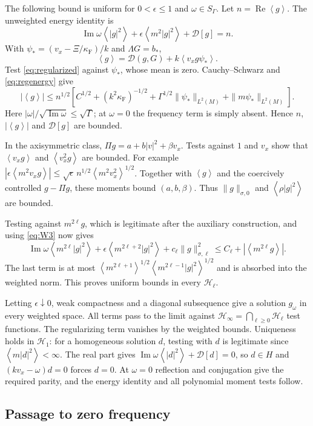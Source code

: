 \documentclass[11pt]{article}
\newcommand{\av}[1]{\left\langle #1\right\rangle}
\newcommand{\D}{\mathcal D}
\newcommand{\HH}{\mathcal H}
\newcommand{\F}{\kappa_{\mathrm F}}
\newcommand{\Real}{\operatorname{Re}}
\newcommand{\Imag}{\operatorname{Im}}
\theoremstyle{definition}
\theoremstyle{remark}
\numberwithin{equation}{section}
\begin{document}
The following bound is uniform for $0<\epsilon\leq1$ and
$\omega\in S_\Gamma$. Let $n=\Real\av g$. The unweighted energy
identity is
\begin{equation}
 \Imag\omega\av{|g|^2}+\epsilon\av{m^2|g|^2}+\D[g]=n.
 \label{eq:regenergy}
\end{equation}
With $\psi_*=(v_x-\Xi/\F)/k$ and $\Lambda G=b_*$,
\[
 \av g=\D(g,G)+k\av{v_xg\psi_*}.
\]
Test \eqref{eq:regularized} against $\psi_*$, whose mean is zero.
Cauchy--Schwarz and \eqref{eq:regenergy} give
\[
 |\av g|\leq n^{1/2}\left[
 C^{1/2}+(k^2\F)^{-1/2}
       +\Gamma^{1/2}\|\psi_*\|_{L^2(M)}
       +\|m\psi_*\|_{L^2(M)}\right].
\]
Here $|\omega|/\sqrt{\Imag\omega}\leq\sqrt\Gamma$; at $\omega=0$
the frequency term is simply absent. Hence $n$, $|\av g|$ and
$\D[g]$ are bounded.

In the axisymmetric class, $\Pi g=a+b|v|^2+\beta v_x$.
Tests against $1$ and $v_x$ show that
$\av{v_xg}$ and $\av{v_x^2g}$ are bounded. For example
$|\epsilon\av{m^2v_xg}|
\leq\sqrt\epsilon\,n^{1/2}\av{m^2v_x^2}^{1/2}$.
Together with $\av g$ and the coercively controlled $g-\Pi g$,
these moments bound $(a,b,\beta)$.
Thus $\|g\|_{\sigma,0}$ and $\av{\rho|g|^2}$ are bounded.

Testing against $m^{2\ell}g$, which is legitimate after the auxiliary
construction, and using \eqref{eq:W3} now gives
\[
 \Imag\omega\av{m^{2\ell}|g|^2}
 +\epsilon\av{m^{2\ell+2}|g|^2}
 +c_\ell\|g\|_{\sigma,\ell}^2
 \leq C_\ell+|\av{m^{2\ell}g}|.
\]
The last term is at most
$\av{m^{2\ell+1}}^{1/2}\av{m^{2\ell-1}|g|^2}^{1/2}$
and is absorbed into the weighted norm.
This proves uniform bounds in every $\HH_\ell$.

Letting $\epsilon\downarrow0$, weak compactness and a diagonal
subsequence give a solution $g_\omega$ in every weighted space.
All terms pass to the limit against
$\HH_\infty=\bigcap_{\ell\geq0}\HH_\ell$ test functions.
The regularizing term vanishes by the weighted bounds.
Uniqueness holds in $\HH_1$: for a homogeneous solution $d$,
testing with $d$ is legitimate since
$\av{m|d|^2}<\infty$. The real part gives
$\Imag\omega\av{|d|^2}+\D[d]=0$,
so $d\in H$ and $(kv_x-\omega)d=0$ forces $d=0$.
At $\omega=0$ reflection and conjugation give the required parity,
and the energy identity and all polynomial moment tests follow.

\subsection{Passage to zero frequency}
\end{document}
